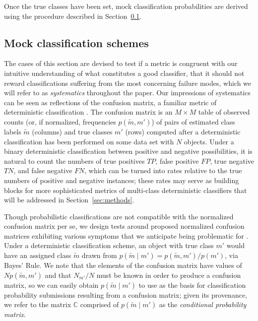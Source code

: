 Once the true classes have been set, mock classification probabilities are derived using the procedure described in Section~\ref{sec:mockdata}.

\subsection{Mock classification schemes}
\label{sec:mockdata}

The cases of this section are devised to test if a metric is congruent with our intuitive understanding of what constitutes a good classifier, that it should not reward classifications suffering from the most concerning failure modes, which we will refer to as \textit{systematics} throughout the paper.
Our impressions of systematics can be seen as reflections of the confusion matrix, a familiar metric of deterministic classification \citep{2012PASP..124.1175B}.
The confusion matrix is an $M \times M$ table of observed counts (or, if normalized, frequencies $p(\tilde{m}, m')$) of pairs of estimated class labels $\tilde{m}$ (columns) and true classes $m'$ (rows) computed after a deterministic classification has been performed on some data set with $N$ objects.
Under a binary deterministic classification between positive and negative possibilities, it is natural to count the numbers of true positives $TP$, false positive $FP$, true negative $TN$, and false negative $FN$, which can be turned into rates relative to the true numbers of positive and negative instances; these rates may serve as building blocks for more sophisticated metrics of multi-class deterministic classifiers that will be addressed in Section~\ref{sec:methods}.

Though probabilistic classifications are not compatible with the normalized confusion matrix per se, we design tests around proposed normalized confusion matrices exhibiting various symptoms that we anticipate being problematic for \lsst.
Under a deterministic classification scheme, an object with true class $m'$ would have an assigned class $\tilde{m}$ drawn from $p(\tilde{m} \mid m') = p(\tilde{m}, m') / p(m')$, via Bayes' Rule.
We note that the elements of the confusion matrix have values of $N p(\tilde{m}, m')$ and that $N_{m'} / N$ must be known in order to produce a confusion matrix, so we can easily obtain $p(\tilde{m} \mid m')$ to use as the basis for classification probability submissions resulting from a confusion matrix; given its provenance, we refer to the matrix $\mathbb{C}$ comprised of $p(\tilde{m} \mid m')$ as the \textit{conditional probability matrix}.

